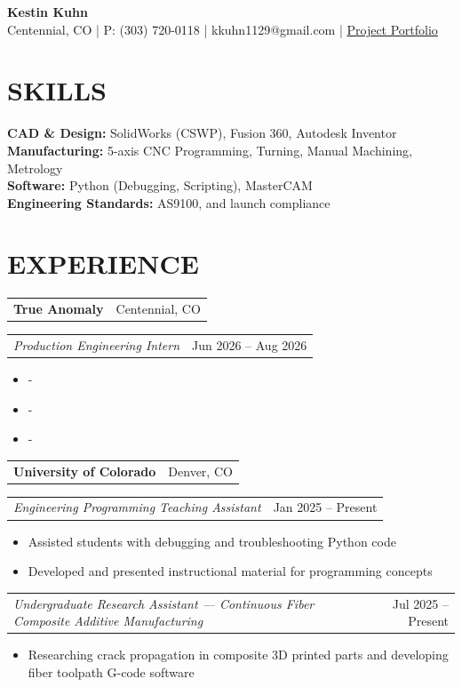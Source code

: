 \documentclass[10pt]{article}
\makeatletter
\newcommand{\companyLine}[2]{
\noindent
\begin{tabular*}{\textwidth}{@{\extracolsep{\fill}} l r}
\textbf{#1} & #2 \\
\end{tabular*}
}
\newcommand{\roleLine}[2]{
\noindent
\begin{tabular*}{\textwidth}{@{\extracolsep{\fill}} l r}
\textit{#1} & #2 \\
\end{tabular*}
}
\makeatother
\begin{document}
\begin{center}
{\Large \textbf{Kestin Kuhn}} \\
Centennial, CO \quad | \quad P: (303) 720-0118 \quad | \quad kkuhn1129@gmail.com \quad | \quad \href{https://kkuhn112.github.io/Personal-Portfolio/}{Project Portfolio}
\end{center}



\section*{SKILLS}

\textbf{CAD \& Design:} SolidWorks (CSWP), Fusion 360, Autodesk Inventor \\
\textbf{Manufacturing:} 5-axis CNC Programming, Turning, Manual Machining, Metrology \\
\textbf{Software:} Python (Debugging, Scripting), MasterCAM \\
\textbf{Engineering Standards:} AS9100, and launch compliance\\


\section*{EXPERIENCE}

\companyLine{True Anomaly}{Centennial, CO}
\roleLine{Production Engineering Intern}{Jun 2026 -- Aug 2026}
\begin{itemize}
\item -
\item -
\item -
\end{itemize}
\vspace{.2em}

\companyLine{University of Colorado}{Denver, CO}
\roleLine{Engineering Programming Teaching Assistant}{Jan 2025 -- Present}
\begin{itemize}
\item Assisted students with debugging and troubleshooting Python code
\item Developed and presented instructional material for programming concepts
\end{itemize}
\vspace{.2em}


\roleLine{Undergraduate Research Assistant — Continuous Fiber Composite Additive Manufacturing }{Jul 2025 -- Present}
\begin{itemize}
\item Researching crack propagation in composite 3D printed parts and developing fiber toolpath G-code software
\end{itemize}
\end{document}
